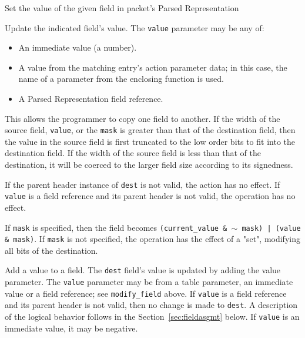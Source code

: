 \documentclass[12pt]{article}
\begin{document}

{ %
Set the value of the given field in packet's Parsed Representation
}
{ %
}
{ %
Update the indicated field's value. The \texttt{value} parameter may be any of:

\begin{itemize}
\item
An immediate value (a number).
\item
A value from the matching entry's action parameter data; in this case, the 
name of a parameter from the enclosing function is used.
\item
A Parsed Representation field reference.
\end{itemize}


This allows the programmer to copy one field to another. If the width of 
the source field, \texttt{value}, or the \texttt{mask} is greater than that of the destination 
field, then the value in the source field is first truncated to the low order 
bits to fit into the destination field. If the width of the source field 
is less than that of the destination, it will be coerced to the larger field 
size according to its signedness.

If the parent header instance of \texttt{dest} is not valid, the action has no effect. 
If \texttt{value} is a field reference and its parent header is not valid, the operation 
has no effect.

If \texttt{mask} is specified, then the field becomes \texttt{(current_value \& $\sim$ mask) | 
(value \& mask)}.  If \texttt{mask} is not specified, the operation has the effect 
of a "set", modifying all bits of the destination. 

}


{ %
Add a value to a field.
}
{ %
}
{ %
The \texttt{dest} field's value is updated by adding the value parameter. The \texttt{value} parameter 
may be from a table parameter, an immediate value {\color{red}or a field reference}; see \texttt{modify_field} above.  If \texttt{value} is a field reference 
and its parent header is not valid, then no change is made to \texttt{dest}. A description 
of the logical behavior follows in the Section~\ref{sec:fieldasgmt} below.
If \texttt{value} is an immediate value, it may 
be negative.
}
\end{document}
